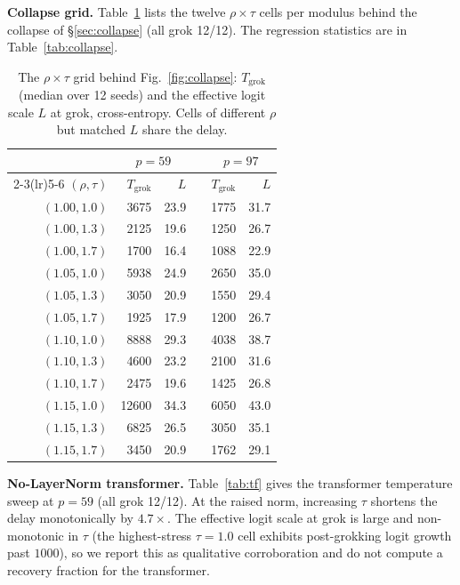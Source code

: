 \textbf{Collapse grid.} Table~\ref{tab:gridcells} lists the twelve $\rho\times\tau$ cells per modulus
behind the collapse of \S\ref{sec:collapse} (all grok 12/12). The regression statistics are in
Table~\ref{tab:collapse}.

\begin{table}[h]\centering\small
\caption{The $\rho\times\tau$ grid behind Fig.~\ref{fig:collapse}: $T_{\mathrm{grok}}$ (median over 12
seeds) and the effective logit scale $L$ at grok, cross-entropy. Cells of different $\rho$ but matched $L$
share the delay.}
\label{tab:gridcells}
\begin{tabular}{rrrrrr}
\toprule
& \multicolumn{2}{c}{$p=59$} & & \multicolumn{2}{c}{$p=97$} \\
\cmidrule(lr){2-3}\cmidrule(lr){5-6}
$(\rho,\tau)$ & $T_{\mathrm{grok}}$ & $L$ & & $T_{\mathrm{grok}}$ & $L$ \\
\midrule
$(1.00,1.0)$ & 3675 & 23.9 & & 1775 & 31.7 \\
$(1.00,1.3)$ & 2125 & 19.6 & & 1250 & 26.7 \\
$(1.00,1.7)$ & 1700 & 16.4 & & 1088 & 22.9 \\
$(1.05,1.0)$ & 5938 & 24.9 & & 2650 & 35.0 \\
$(1.05,1.3)$ & 3050 & 20.9 & & 1550 & 29.4 \\
$(1.05,1.7)$ & 1925 & 17.9 & & 1200 & 26.7 \\
$(1.10,1.0)$ & 8888 & 29.3 & & 4038 & 38.7 \\
$(1.10,1.3)$ & 4600 & 23.2 & & 2100 & 31.6 \\
$(1.10,1.7)$ & 2475 & 19.6 & & 1425 & 26.8 \\
$(1.15,1.0)$ & 12600 & 34.3 & & 6050 & 43.0 \\
$(1.15,1.3)$ & 6825 & 26.5 & & 3050 & 35.1 \\
$(1.15,1.7)$ & 3450 & 20.9 & & 1762 & 29.1 \\
\bottomrule
\end{tabular}
\end{table}

\textbf{No-LayerNorm transformer.} Table~\ref{tab:tf} gives the transformer temperature sweep at $p=59$
(all grok 12/12). At the raised norm, increasing $\tau$ shortens the delay monotonically by $4.7\times$.
The effective logit scale at grok is large and non-monotonic in $\tau$ (the highest-stress $\tau=1.0$ cell
exhibits post-grokking logit growth past $1000$), so we report this as qualitative corroboration and do not
compute a recovery fraction for the transformer.

